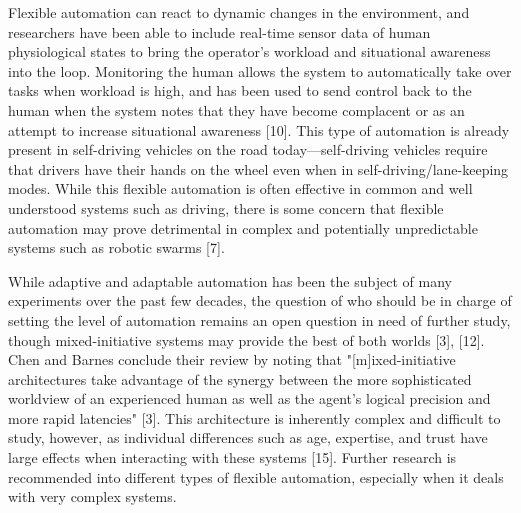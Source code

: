 Flexible automation can react to dynamic changes in the environment, and researchers have been able to include real-time sensor data of human physiological states to bring the operator's workload and situational awareness into the loop. Monitoring the human allows the system to automatically take over tasks when workload is high, and has been used to send control back to the human when the system notes that they have become complacent or as an attempt to increase situational awareness [10]. This type of automation is already present in self-driving vehicles on the road today—self-driving vehicles require that drivers have their hands on the wheel even when in self-driving/lane-keeping modes. While this flexible automation is often effective in common and well understood systems such as driving, there is some concern that flexible automation may prove detrimental in complex and potentially unpredictable systems such as robotic swarms [7].

While adaptive and adaptable automation has been the subject of many experiments over the past few decades, the question of who should be in charge of setting the level of automation remains an open question in need of further study, though mixed-initiative systems may provide the best of both worlds [3], [12]. Chen and Barnes conclude their review by noting that "[m]ixed-initiative architectures take advantage of the synergy between the more sophisticated worldview of an experienced human as well as the agent’s logical precision and more rapid latencies" [3]. This architecture is inherently complex and difficult to study, however, as individual differences such as age, expertise, and trust have large effects when interacting with these systems [15]. Further research is recommended into different types of flexible automation, especially when it deals with very complex systems.

